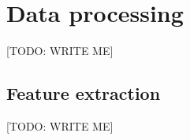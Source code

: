 \documentclass{article} %
\begin{document}


\section{Data processing}
\label{sec:dataprocessing}

[TODO: WRITE ME]


\subsection{Feature extraction}
\label{sec:featureextraction}

[TODO: WRITE ME]

\end{document}
